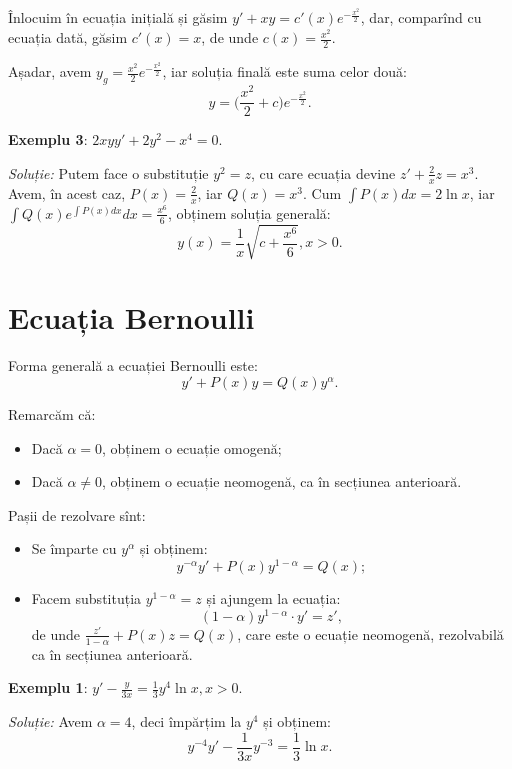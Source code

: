 \documentclass[11pt,a4paper]{article}
\theoremstyle{dotless}
\theoremstyle{dotlessdr}
\begin{document}
Înlocuim în ecuația inițială și găsim $y' + xy = c'(x) e^{-\frac{x^2}{2}}$, dar, comparînd
cu ecuația dată, găsim $c'(x) = x$, de unde $c(x) = \frac{x^2}{2}$.

Așadar, avem $y_g = \frac{x^2}{2} e^{-\frac{x^2}{2}}$, iar soluția finală este suma celor două:
\[
  y = \Big( \frac{x^2}{2} + c \Big) e^{-\frac{x^2}{2}}.
\]

\vspace{1cm}

\textbf{Exemplu 3}: $2xyy' + 2y^2 - x^4 = 0$.

\emph{Soluție:} Putem face o substituție $y^2 = z$, cu care
ecuația devine $z' + \frac{2}{x} z = x^3$. Avem, în acest caz, $P(x) = \frac{2}{x}$,
iar $Q(x) = x^3$. Cum $\int P(x) dx = 2 \ln x$, iar $\int Q(x) e^{\int P(x) dx} dx = \frac{x^6}{6}$,
obținem soluția generală:
\[
  y(x) = \frac{1}{x} \sqrt{c + \frac{x^6}{6}}, x > 0.
\]


\section{Ecuația Bernoulli}
\label{sec:bernoulli}

Forma generală a ecuației Bernoulli este:
\[
  y' + P(x) y = Q(x) y^\alpha.
\]

Remarcăm că:
\begin{itemize}
\item Dacă $\alpha = 0$, obținem o ecuație omogenă;
\item Dacă $\alpha \neq 0$, obținem o ecuație neomogenă, ca în secțiunea anterioară.
\end{itemize}

Pașii de rezolvare sînt:
\begin{itemize}
\item Se împarte cu $y^\alpha$ și obținem:
  \[
    y^{-\alpha} y' + P(x) y^{1 - \alpha} = Q(x);
  \]
\item Facem substituția $y^{1 - \alpha} = z$ și ajungem la ecuația:
  \[
    (1 - \alpha) y^{1 - \alpha} \cdot y' = z',
\]
de unde $\frac{z'}{1 - \alpha} + P(x) z = Q(x)$, care este o ecuație
neomogenă, rezolvabilă ca în secțiunea anterioară.
\end{itemize}

\textbf{Exemplu 1}: $y' - \frac{y}{3x} = \frac{1}{3} y^4 \ln x, x > 0$.

\emph{Soluție:} Avem $\alpha = 4$, deci împărțim la $y^4$ și obținem:
\[
  y^{-4} y' - \frac{1}{3x} y^{-3} = \frac{1}{3} \ln x.
\]
\end{document}
